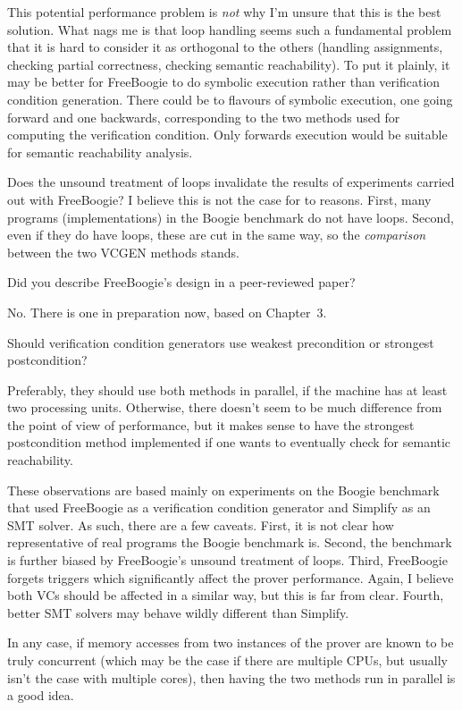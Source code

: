 This potential performance problem is {\it not\/} why I'm unsure that this
is the best solution. What nags me is that loop handling seems such a
fundamental problem that it is hard to consider it as orthogonal to the
others (handling assignments, checking partial correctness, checking
semantic reachability). To put it plainly, it may be better for FreeBoogie
to do symbolic execution rather than verification condition generation.
There could be to flavours of symbolic execution, one going forward and one
backwards, corresponding to the two methods used for computing the
verification condition. Only forwards execution would be suitable for
semantic reachability analysis.

Does the unsound treatment of loops invalidate the results of experiments
carried out with FreeBoogie? I believe this is not the case for to reasons.
First, many programs (implementations) in the Boogie benchmark do not have
loops. Second, even if they do have loops, these are cut in the same way,
so the {\it comparison\/} between the two VCGEN methods stands.


\Q Did you describe FreeBoogie's design in a peer-reviewed paper?

\A No. There is one in preparation now, based on Chapter~3.

\Q Should verification condition generators use weakest precondition or
strongest postcondition?

\A Preferably, they should use both methods in parallel, if the machine has
at least two processing units. Otherwise, there doesn't seem to be much
difference from the point of view of performance, but it makes sense to
have the strongest postcondition method implemented if one wants to
eventually check for semantic reachability.

These observations are based mainly on experiments on the Boogie benchmark
that used FreeBoogie as a verification condition generator and Simplify as
an SMT solver. As such, there are a few caveats. First, it is not clear how
representative of real programs the Boogie benchmark is. Second, the
benchmark is further biased by FreeBoogie's unsound treatment of loops.
Third, FreeBoogie forgets triggers which significantly affect the prover
performance. Again, I believe both VCs should be affected in a similar way,
but this is far from clear.  Fourth, better SMT solvers may behave wildly
different than Simplify.

In any case, if memory accesses from two instances of the prover are
known to be truly concurrent (which may be the case if there are multiple
CPUs, but usually isn't the case with multiple cores), then having the two
methods run in parallel is a good idea.

